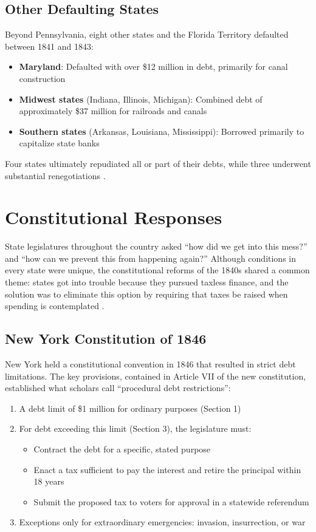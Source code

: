 \documentclass[12pt]{article}
\begin{document}
\subsection{Other Defaulting States}

Beyond Pennsylvania, eight other states and the Florida Territory defaulted between 1841 and 1843:
\begin{itemize}
\item \textbf{Maryland}: Defaulted with over \$12 million in debt, primarily for canal construction
\item \textbf{Midwest states} (Indiana, Illinois, Michigan): Combined debt of approximately \$37 million for railroads and canals
\item \textbf{Southern states} (Arkansas, Louisiana, Mississippi): Borrowed primarily to capitalize state banks
\end{itemize}

Four states ultimately repudiated all or part of their debts, while three underwent substantial renegotiations \citep{grinath1997debt}.

\section{Constitutional Responses}

State legislatures throughout the country asked ``how did we get into this mess?'' and ``how can we prevent this from happening again?'' Although conditions in every state were unique, the constitutional reforms of the 1840s shared a common theme: states got into trouble because they pursued taxless finance, and the solution was to eliminate this option by requiring that taxes be raised when spending is contemplated \citep{wallis2005constitutions}.

\subsection{New York Constitution of 1846}

New York held a constitutional convention in 1846 that resulted in strict debt limitations. The key provisions, contained in Article VII of the new constitution, established what scholars call ``procedural debt restrictions'':

\begin{enumerate}
\item A debt limit of \$1 million for ordinary purposes (Section 1)
\item For debt exceeding this limit (Section 3), the legislature must:
\begin{itemize}
\item Contract the debt for a specific, stated purpose
\item Enact a tax sufficient to pay the interest and retire the principal within 18 years
\item Submit the proposed tax to voters for approval in a statewide referendum
\end{itemize}
\item Exceptions only for extraordinary emergencies: invasion, insurrection, or war
\end{enumerate}
\end{document}
